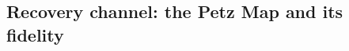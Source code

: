 \documentclass[a4paper,11pt]{article}
\newcommand{\SV}[1]{\textcolor{red}{#1}}
\newcommand{\Tr}{\text{Tr}}
\begin{document}
\begin{enumerate}



\subsection{Recovery channel: the Petz Map and its fidelity}


\end{enumerate}
\end{document}
